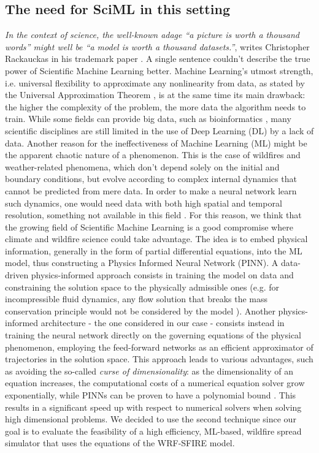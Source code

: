 \documentclass{juliacon}
\begin{document}
\subsection{The need for SciML in this setting}
\textit{In the context of science, the well-known adage “a picture is worth a thousand words” might well be “a model is worth a thousand datasets.”}, writes Christopher Rackauckas in his trademark paper \cite{Rackauckas}. A single sentence couldn't describe the true power of Scientific Machine Learning better. Machine Learning's utmost strength, i.e. universal flexibility to approximate any nonlinearity from data, as stated by the Universal Approximation Theorem \cite{Kurkova}, is at the same time its main drawback: the higher the complexity of the problem, the more data the algorithm needs to train.
While some fields can provide big data, such as bioinformatics \cite{Yu}, many scientific disciplines are still limited in the use of Deep Learning (DL) by a lack of data. Another reason for the ineffectiveness of Machine Learning (ML) might be the apparent chaotic nature of a phenomenon. This is the case of wildfires and weather-related phenomena, which don't depend solely on the initial and boundary conditions, but evolve according to complex internal dynamics that cannot be predicted from mere data. In order to make a neural network learn such dynamics, one would need data with both high spatial and temporal resolution, something not available in this field \cite{Cenci}.
For this reason, we think that the growing field of Scientific Machine Learning is a good compromise where climate and wildfire science could take advantage. The idea is to embed physical information, generally in the form of partial differential equations, into the ML model, thus constructing a Physics Informed Neural Network (PINN). A data-driven physics-informed approach consists in training the model on data and constraining the solution space to the physically admissible ones (e.g. for incompressible fluid dynamics, any flow solution that breaks the mass conservation principle would not be considered by the model \cite{raissi}).
Another physics-informed architecture - the one considered in our case - consists instead in training the neural network directly on the governing equations of the physical phenomenon, employing the feed-forward networks as an efficient approximator of trajectories in the solution space. This approach leads to various advantages, such as avoiding the so-called \textit{curse of dimensionality}: as the dimensionality of an equation increases, the computational costs of a numerical equation solver grow exponentially, while PINNs can be proven to have a polynomial bound \cite{Grohs}. This results in a significant speed up with respect to numerical solvers when solving high dimensional problems.
We decided to use the second technique since our goal is to evaluate the feasibility of a high efficiency, ML-based, wildfire spread simulator that uses the equations of the WRF-SFIRE model.
\end{document}
